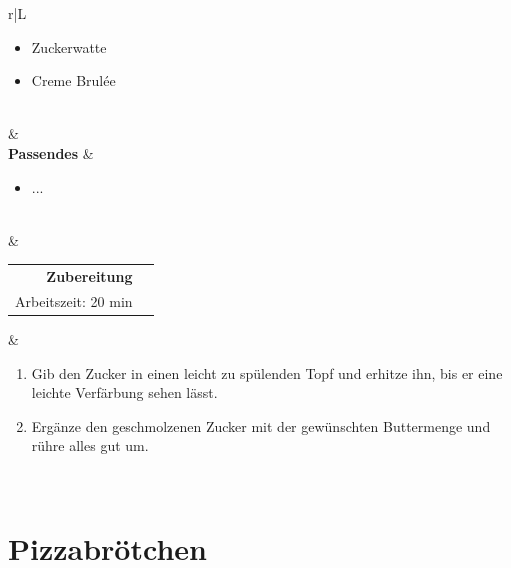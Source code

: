 \documentclass[a4paper, 12pt]{scrbook} 								%
\numberwithin{equation}{section} 									%
\begin{document}
\begin{tabularx}{\textwidth}{r|L}
\begin{itemize}[nosep]
										\item Zuckerwatte
										\item Creme Brulée
									\end{itemize}	\\
								&	\\	
		\textbf{Passendes}		&	\begin{itemize}[nosep]
										\item ...
									\end{itemize}	\\
								&	\\	
		\begin{tabular}[t]{rr}
			\textbf{Zubereitung}	\\
			Arbeitszeit: 20 min	\\
		\end{tabular}			&	\begin{enumerate}[nosep]
										\item Gib den Zucker in einen leicht zu spülenden Topf und erhitze ihn, bis er eine leichte Verfärbung sehen lässt.
										\item Ergänze den geschmolzenen Zucker mit der gewünschten Buttermenge und rühre alles gut um.
									\end{enumerate}	\\
	\end{tabularx}
	\newpage


	\section{Pizzabrötchen}	\label{pizzabroetchen}
\end{document}
